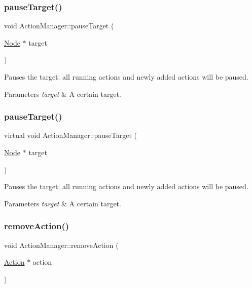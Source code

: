 \subsubsection{\texorpdfstring{pause\+Target()}{pauseTarget()}\hspace{0.1cm}{\footnotesize\ttfamily [1/2]}}
{\footnotesize\ttfamily void Action\+Manager\+::pause\+Target (\begin{DoxyParamCaption}\item[{\hyperlink{classNode}{Node} $\ast$}]{target }\end{DoxyParamCaption})}

Pauses the target\+: all running actions and newly added actions will be paused.


\begin{DoxyParams}{Parameters}
{\em target} & A certain target. \\
\hline
\end{DoxyParams}
\mbox{\label{classActionManager_ad64ac670ed9229018f349741835c6509}} 
\subsubsection{\texorpdfstring{pause\+Target()}{pauseTarget()}\hspace{0.1cm}{\footnotesize\ttfamily [2/2]}}
{\footnotesize\ttfamily virtual void Action\+Manager\+::pause\+Target (\begin{DoxyParamCaption}\item[{\hyperlink{classNode}{Node} $\ast$}]{target }\end{DoxyParamCaption})\hspace{0.3cm}{\ttfamily [virtual]}}

Pauses the target\+: all running actions and newly added actions will be paused.


\begin{DoxyParams}{Parameters}
{\em target} & A certain target. \\
\hline
\end{DoxyParams}
\mbox{\label{classActionManager_a06b04334e6282eba060000694088c807}} 
\subsubsection{\texorpdfstring{remove\+Action()}{removeAction()}\hspace{0.1cm}{\footnotesize\ttfamily [1/2]}}
{\footnotesize\ttfamily void Action\+Manager\+::remove\+Action (\begin{DoxyParamCaption}\item[{\hyperlink{classAction}{Action} $\ast$}]{action }\end{DoxyParamCaption})}

